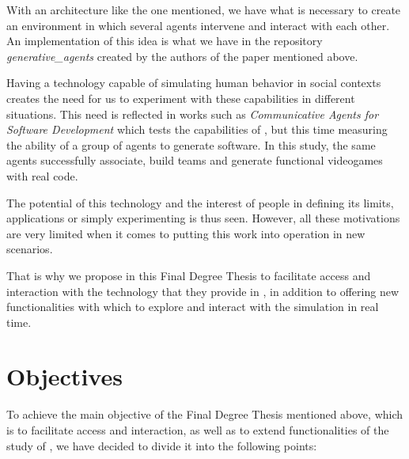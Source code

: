 With an architecture like the one mentioned, we have what is necessary to create an environment in which several agents intervene and interact with each other. An implementation of this idea is what we have in the repository \textit{generative\_agents} created by the authors of the paper mentioned above.

Having a technology capable of simulating human behavior in social contexts creates the need for us to experiment with these capabilities in different situations. This need is reflected in works such as \textit{Communicative Agents for Software Development} which tests the capabilities of \ga, but this time measuring the ability of a group of agents to generate software. In this study, the same agents successfully associate, build teams and generate functional videogames with real code.

The potential of this technology and the interest of people in defining its limits, applications or simply experimenting is thus seen. However, all these motivations are very limited when it comes to putting this work into operation in new scenarios.

That is why we propose in this Final Degree Thesis to facilitate access and interaction with the technology that they provide in \ga, in addition to offering new functionalities with which to explore and interact with the simulation in real time.

\section{Objectives}
To achieve the main objective of the Final Degree Thesis mentioned above, which is to facilitate access and interaction, as well as to extend functionalities of the study of \ga, we have decided to divide it into the following points:

